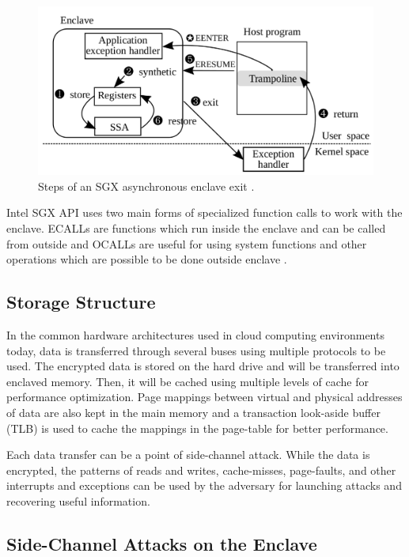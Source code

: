 \begin{figure}
	\includegraphics[scale=0.2]{images/tsgx}
	\caption{Steps of an SGX asynchronous enclave exit \cite{tsgx}.}
	\label{fig:aex}
\end{figure}

Intel SGX API \cite{sgxapi} uses two main forms of specialized function calls to work with the enclave. ECALLs are functions which run inside the enclave and can be called from outside and OCALLs are useful for using system functions and other operations which are possible to be done outside enclave \cite{ecallocall}.



\subsection{Storage Structure}

In the common hardware architectures used in cloud computing environments today, data is transferred through several buses using multiple protocols to be used. The encrypted data is stored on the hard drive and will be transferred into enclaved memory. Then, it will be cached using multiple levels of cache for performance optimization. Page mappings between virtual and physical addresses of data are also kept in the main memory and a transaction look-aside buffer (TLB) is used to cache the mappings in the page-table for better performance.

Each data transfer can be a point of side-channel attack. While the data is encrypted, the patterns of reads and writes, cache-misses, page-faults, and other interrupts and exceptions can be used by the adversary for launching attacks and recovering useful information.

\subsection{Side-Channel Attacks on the Enclave}

